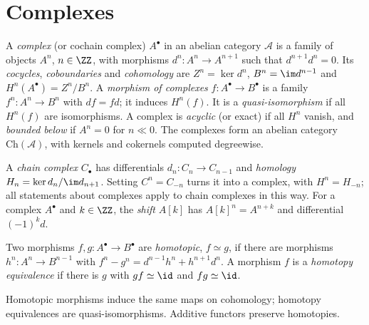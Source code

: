 \section{Complexes}\label{homological-algebra:section-complexes}

\begin{definition}\label{homological-algebra:definition-complex}
A \emph{complex} (or cochain complex) $A^\bullet$ in an abelian category $\mathcal{A}$ is a family of objects $A^n$,
$n \in \ZZ$, with morphisms $d^n \colon A^n \to A^{n+1}$ such that $d^{n+1}d^n = 0$. Its \emph{cocycles}, \emph{coboundaries} and
\emph{cohomology} are $Z^n = \ker d^n$, $B^n = \im d^{n-1}$ and $H^n(A^\bullet) = Z^n/B^n$. A \emph{morphism of complexes}
$f \colon A^\bullet \to B^\bullet$ is a family $f^n \colon A^n \to B^n$ with $df = fd$; it induces $H^n(f)$. It is a
\emph{quasi-isomorphism} if all $H^n(f)$ are isomorphisms. A complex is \emph{acyclic} (or exact) if all $H^n$ vanish, and
\emph{bounded below} if $A^n = 0$ for $n \ll 0$. The complexes form an abelian category $\mathrm{Ch}(\mathcal{A})$, with
kernels and cokernels computed degreewise.
\end{definition}

\begin{notation}\label{homological-algebra:notation-chain-complexes}
A \emph{chain complex} $C_\bullet$ has differentials $d_n \colon C_n \to C_{n-1}$ and \emph{homology}
$H_n = \ker d_n/\im d_{n+1}$. Setting $C^n = C_{-n}$ turns it into a complex, with $H^n = H_{-n}$; all statements about
complexes apply to chain complexes in this way. For a complex $A^\bullet$ and $k \in \ZZ$, the \emph{shift} $A[k]$ has
$A[k]^n = A^{n+k}$ and differential $(-1)^kd$.
\end{notation}

\begin{definition}\label{homological-algebra:definition-homotopy}
Two morphisms $f, g \colon A^\bullet \to B^\bullet$ are \emph{homotopic}, $f \simeq g$, if there are morphisms
$h^n \colon A^n \to B^{n-1}$ with $f^n - g^n = d^{n-1}h^n + h^{n+1}d^n$. A morphism $f$ is a \emph{homotopy equivalence} if there
is $g$ with $gf \simeq \id$ and $fg \simeq \id$.
\end{definition}

\begin{lemma}\label{homological-algebra:lemma-homotopy-invariance}
Homotopic morphisms induce the same maps on cohomology; homotopy equivalences are quasi-isomorphisms. Additive
functors preserve homotopies.
\end{lemma}

